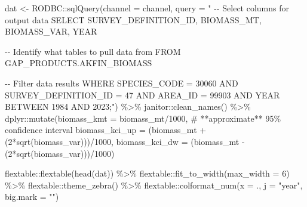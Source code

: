 \documentclass[
  letterpaper,
  oneside,
  open=any]{scrbook}
\newenvironment{Shaded}{\begin{snugshade}}{\end{snugshade}}
\newcommand{\AttributeTok}[1]{\textcolor[rgb]{0.40,0.45,0.13}{#1}}
\newcommand{\CommentTok}[1]{\textcolor[rgb]{0.37,0.37,0.37}{#1}}
\newcommand{\DecValTok}[1]{\textcolor[rgb]{0.68,0.00,0.00}{#1}}
\newcommand{\FunctionTok}[1]{\textcolor[rgb]{0.28,0.35,0.67}{#1}}
\newcommand{\NormalTok}[1]{\textcolor[rgb]{0.00,0.23,0.31}{#1}}
\newcommand{\OtherTok}[1]{\textcolor[rgb]{0.00,0.23,0.31}{#1}}
\newcommand{\SpecialCharTok}[1]{\textcolor[rgb]{0.37,0.37,0.37}{#1}}
\newcommand{\StringTok}[1]{\textcolor[rgb]{0.13,0.47,0.30}{#1}}
\begin{document}
\begin{Shaded}
\begin{Highlighting}[]
\NormalTok{dat }\OtherTok{\textless{}{-}}\NormalTok{ RODBC}\SpecialCharTok{::}\FunctionTok{sqlQuery}\NormalTok{(}\AttributeTok{channel =}\NormalTok{ channel, }
                       \AttributeTok{query =} 
                         \StringTok{"}
\StringTok{{-}{-} Select columns for output data}
\StringTok{SELECT }
\StringTok{SURVEY\_DEFINITION\_ID, }
\StringTok{BIOMASS\_MT, }
\StringTok{BIOMASS\_VAR, }
\StringTok{YEAR}

\StringTok{{-}{-} Identify what tables to pull data from}
\StringTok{FROM GAP\_PRODUCTS.AKFIN\_BIOMASS}

\StringTok{{-}{-} Filter data results}
\StringTok{WHERE SPECIES\_CODE = 30060 }
\StringTok{AND SURVEY\_DEFINITION\_ID = 47 }
\StringTok{AND AREA\_ID = 99903 }
\StringTok{AND YEAR BETWEEN 1984 AND 2023;"}\NormalTok{) }\SpecialCharTok{\%\textgreater{}\%} 
\NormalTok{  janitor}\SpecialCharTok{::}\FunctionTok{clean\_names}\NormalTok{() }\SpecialCharTok{\%\textgreater{}\%} 
\NormalTok{  dplyr}\SpecialCharTok{::}\FunctionTok{mutate}\NormalTok{(}\AttributeTok{biomass\_kmt =}\NormalTok{ biomass\_mt}\SpecialCharTok{/}\DecValTok{1000}\NormalTok{, }
                \CommentTok{\# **approximate** 95\% confidence interval}
                \AttributeTok{biomass\_kci\_up =}\NormalTok{ (biomass\_mt }\SpecialCharTok{+}\NormalTok{ (}\DecValTok{2}\SpecialCharTok{*}\FunctionTok{sqrt}\NormalTok{(biomass\_var)))}\SpecialCharTok{/}\DecValTok{1000}\NormalTok{, }
                \AttributeTok{biomass\_kci\_dw =}\NormalTok{ (biomass\_mt }\SpecialCharTok{{-}}\NormalTok{ (}\DecValTok{2}\SpecialCharTok{*}\FunctionTok{sqrt}\NormalTok{(biomass\_var)))}\SpecialCharTok{/}\DecValTok{1000}\NormalTok{) }
\end{Highlighting}
\end{Shaded}

\begin{Shaded}
\begin{Highlighting}[]
\NormalTok{flextable}\SpecialCharTok{::}\FunctionTok{flextable}\NormalTok{(}\FunctionTok{head}\NormalTok{(dat)) }\SpecialCharTok{\%\textgreater{}\%}
\NormalTok{  flextable}\SpecialCharTok{::}\FunctionTok{fit\_to\_width}\NormalTok{(}\AttributeTok{max\_width =} \DecValTok{6}\NormalTok{) }\SpecialCharTok{\%\textgreater{}\%} 
\NormalTok{  flextable}\SpecialCharTok{::}\FunctionTok{theme\_zebra}\NormalTok{() }\SpecialCharTok{\%\textgreater{}\%}
\NormalTok{  flextable}\SpecialCharTok{::}\FunctionTok{colformat\_num}\NormalTok{(}\AttributeTok{x =}\NormalTok{ ., }\AttributeTok{j =} \StringTok{"year"}\NormalTok{, }\AttributeTok{big.mark =} \StringTok{""}\NormalTok{)}
\end{Highlighting}
\end{Shaded}
\end{document}
